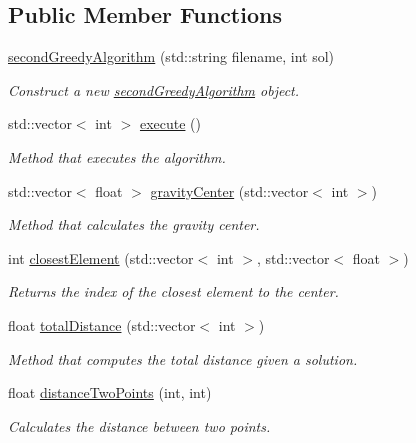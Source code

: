 \subsection*{Public Member Functions}
\begin{DoxyCompactItemize}
\item 
\hyperlink{classsecondGreedyAlgorithm_acbb57b3cc5b088ee401be24841e10eef}{second\+Greedy\+Algorithm} (std\+::string filename, int sol)
\begin{DoxyCompactList}\small\item\em Construct a new \hyperlink{classsecondGreedyAlgorithm}{second\+Greedy\+Algorithm} object. \end{DoxyCompactList}\item 
std\+::vector$<$ int $>$ \hyperlink{classsecondGreedyAlgorithm_a119a730116003d00438179ccf4e2cafd}{execute} ()
\begin{DoxyCompactList}\small\item\em Method that executes the algorithm. \end{DoxyCompactList}\item 
std\+::vector$<$ float $>$ \hyperlink{classsecondGreedyAlgorithm_a95e094bd3f2ee22127eaaf734c2cee8a}{gravity\+Center} (std\+::vector$<$ int $>$)
\begin{DoxyCompactList}\small\item\em Method that calculates the gravity center. \end{DoxyCompactList}\item 
int \hyperlink{classsecondGreedyAlgorithm_ad34d30fcba1f3d71dc67ea6b12d5d0b8}{closest\+Element} (std\+::vector$<$ int $>$, std\+::vector$<$ float $>$)
\begin{DoxyCompactList}\small\item\em Returns the index of the closest element to the center. \end{DoxyCompactList}\item 
float \hyperlink{classsecondGreedyAlgorithm_a21a936acf628b02184e745faf918618a}{total\+Distance} (std\+::vector$<$ int $>$)
\begin{DoxyCompactList}\small\item\em Method that computes the total distance given a solution. \end{DoxyCompactList}\item 
float \hyperlink{classsecondGreedyAlgorithm_a72574b0ef83083f7994af0eb4007cf39}{distance\+Two\+Points} (int, int)
\begin{DoxyCompactList}\small\item\em Calculates the distance between two points. \end{DoxyCompactList}\end{DoxyCompactItemize}
